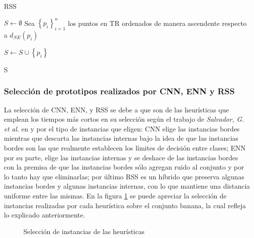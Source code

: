 \begin{algorithm}
\caption{RSS}
\label{rss}
\begin{algorithmic}[1]


\State $S \gets \emptyset$
\State Sea $\left\{p_i\right\}_{i=1}^n$ los puntos en TR ordenados de manera ascendente respecto a $d_{NE}(p_i)$

		\State $S \gets S \cup \left\{p_i\right\}$
	\EndIf
\EndFor

\State \Return S

\end{algorithmic}
\end{algorithm}

\subsubsection{Selección de prototipos realizados por CNN, ENN y RSS}

La selección de CNN, ENN, y RSS se debe a que son de las heurísticas que emplean los tiempos más cortos en su selección según el trabajo de \emph{Salvador, G. et al.} en \cite{garcia2012prototype} y por el tipo de instancias que eligen: CNN elige las instancias bordes mientras que descarta las instancias internas bajo la idea de que las instancias bordes son las que realmente establecen los límites de decisión entre clases; ENN por su parte, elige las instancias internas y se deshace de las instancias bordes con la premisa de que las instancias bordes sólo agregan ruido al conjunto y por lo tanto hay que eliminarlas; por último RSS es un híbrido que preserva algunas instancias bordes y algunas instancias internas, con lo que mantiene una distancia uniforme entre las mismas. En la figura \ref{heu2} se puede apreciar la selección de instancias realizadas por cada heurística sobre el conjunto banana, la cual refleja lo explicado anteriormente.

\begin{figure}[]

	\centering

\caption{Selección de instancias de las heurísticas}
\label{heu2}
\end{figure}


